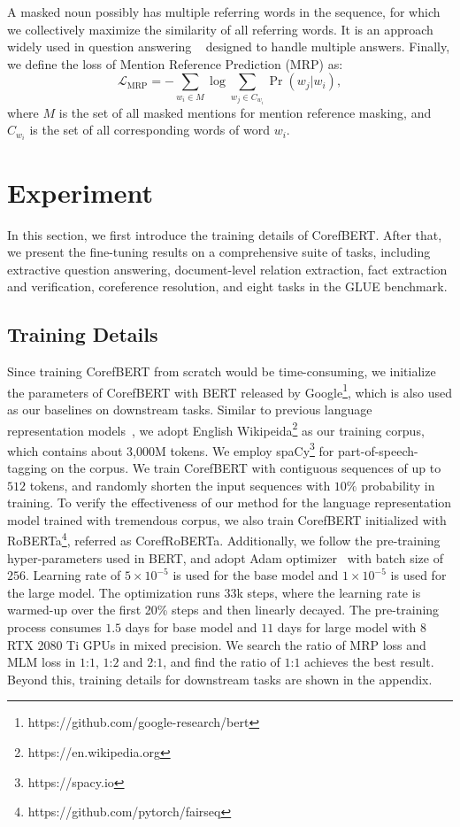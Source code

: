 \documentclass[11pt,a4paper]{article}
\newcommand\CorefBERT{CorefBERT\xspace}
\begin{document}
A masked noun possibly has multiple referring words in the sequence, for which we collectively maximize the similarity of all referring words. It is an approach widely used in question answering ~\citep{ASReader, NeuralCascades, sharednorm} designed to handle multiple answers. Finally, we define the loss of Mention Reference Prediction (MRP) as:
\begin{equation}
\mathcal{L}_{\text{MRP}} = - \sum_{w_i \in {M} } \log \sum_{w_j \in C_{w_i}} \Pr(w_j|w_i),
\end{equation}
where $M$ is the set of all masked mentions for mention reference masking, and  $C_{w_i}$ is the set of all corresponding words of word  $w_i$.









\section{Experiment}
In this section, we first introduce the training details of  \CorefBERT. After that, we present the fine-tuning results on a comprehensive suite of tasks, including extractive question answering, document-level relation extraction, fact extraction and verification, coreference resolution, and eight tasks in the GLUE benchmark.

\subsection{Training Details}
Since training \CorefBERT from scratch would be time-consuming, we initialize the parameters of \CorefBERT with BERT  released by Google\footnote{{https://github.com/google-research/bert}}, which is also used as our baselines on  downstream tasks. 
Similar to previous language representation models~\citep{BERT, Spanbert}, we adopt English Wikipeida\footnote{{https://en.wikipedia.org}} as our training corpus, which contains about 3,000M tokens.  We employ {spaCy}\footnote{{https://spacy.io}} for part-of-speech-tagging on the corpus. 
We train CorefBERT with contiguous sequences of up to $512$ tokens, and randomly shorten the input sequences with $10\%$ probability in training.   To verify the effectiveness of our method for the language representation model trained with tremendous corpus, we also train CorefBERT initialized with RoBERTa\footnote{{https://github.com/pytorch/fairseq}}, referred as CorefRoBERTa.
Additionally, we follow the pre-training hyper-parameters used in BERT, and adopt Adam optimizer~\citep{Adam}  with batch size of $256$.  Learning rate of $5\times 10^{-5}$ is used for the base model and $1\times10^{-5}$ is used for the large model. The optimization runs $33$k steps, 
where the learning rate is warmed-up over the first 20\% steps and then linearly decayed.
The pre-training process consumes $1.5$ days for base model and $11$ days for large model with 8 RTX 2080 Ti GPUs in mixed precision. We search the ratio of MRP loss and MLM loss in $1$:$1$, $1$:$2$ and $2$:$1$, and find the ratio of $1$:$1$ achieves the best result. Beyond this, training details for downstream tasks are shown in the appendix. 
\end{document}
